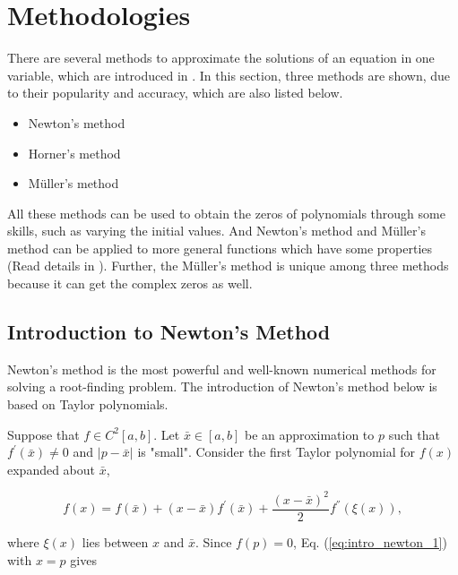 \documentclass[preprint,12pt]{elsarticle}
\begin{document}
\section{Methodologies}
\label{S:2}

There are several methods to approximate the solutions of an equation in one variable, which are introduced in \cite{burden:2001qr}. In this section, three methods are shown, due to their popularity and accuracy, which are also listed below.

\begin{itemize}
\item Newton's method
\item Horner's method
\item M\"uller's method
\end{itemize}


All these methods can be used to obtain the zeros of polynomials through some skills, such as varying the initial values. And Newton's method and M\"uller's method can be applied to more general functions which have some properties (Read details in \cite{burden:2001qr}). Further, the M\"uller's method is unique among three methods because it can get the complex zeros as well.

\subsection{Introduction to Newton's Method}
\label{SS:2.1}

Newton's method is the most powerful and well-known numerical methods for solving a root-finding problem. The introduction of Newton's method below is based on Taylor polynomials.

Suppose that $f\in C^2[a,b]$. Let $\bar{x}\in[a,b]$ be an approximation to $p$ such that $f^{'}(\bar{x})\neq0$ and $|p-\bar{x}|$ is "small". Consider the first Taylor polynomial for $f(x)$ expanded about $\bar{x}$,

\begin{equation}
\label{eq:intro_newton_1}
    f(x)=f(\bar{x})+(x-\bar{x})f^{'}(\bar{x})+\frac{(x-\bar{x})^2}{2}f^{''}(\xi(x)),
\end{equation}

where $\xi(x)$ lies between $x$ and $\bar{x}$. Since $f(p)=0$, Eq. (\ref{eq:intro_newton_1}) with $x=p$ gives 
\end{document}
